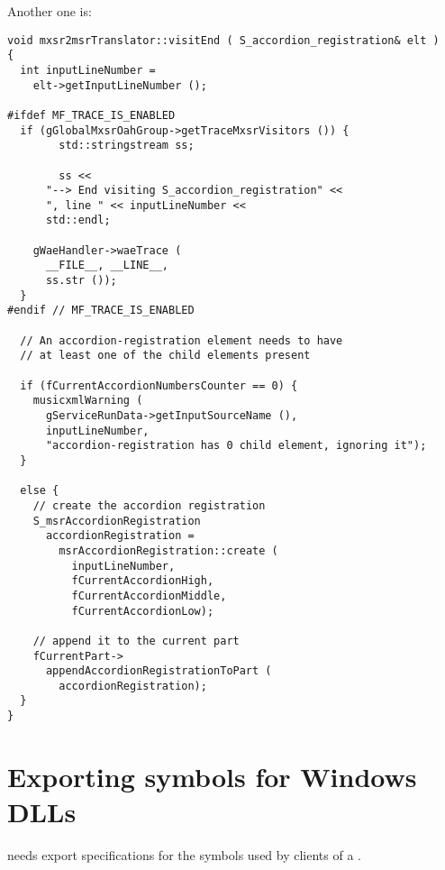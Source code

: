Another one is:
\begin{lstlisting}[language=CPlusPlus]
void mxsr2msrTranslator::visitEnd ( S_accordion_registration& elt )
{
  int inputLineNumber =
    elt->getInputLineNumber ();

#ifdef MF_TRACE_IS_ENABLED
  if (gGlobalMxsrOahGroup->getTraceMxsrVisitors ()) {
		std::stringstream ss;

		ss <<
      "--> End visiting S_accordion_registration" <<
      ", line " << inputLineNumber <<
      std::endl;

    gWaeHandler->waeTrace (
      __FILE__, __LINE__,
      ss.str ());
  }
#endif // MF_TRACE_IS_ENABLED

  // An accordion-registration element needs to have
  // at least one of the child elements present

  if (fCurrentAccordionNumbersCounter == 0) {
    musicxmlWarning (
      gServiceRunData->getInputSourceName (),
      inputLineNumber,
      "accordion-registration has 0 child element, ignoring it");
  }

  else {
    // create the accordion registration
    S_msrAccordionRegistration
      accordionRegistration =
        msrAccordionRegistration::create (
          inputLineNumber,
          fCurrentAccordionHigh,
          fCurrentAccordionMiddle,
          fCurrentAccordionLow);

    // append it to the current part
    fCurrentPart->
      appendAccordionRegistrationToPart (
        accordionRegistration);
  }
}
\end{lstlisting}


\section{Exporting symbols for Windows DLLs}

 needs export specifications for the symbols used by clients of a .

